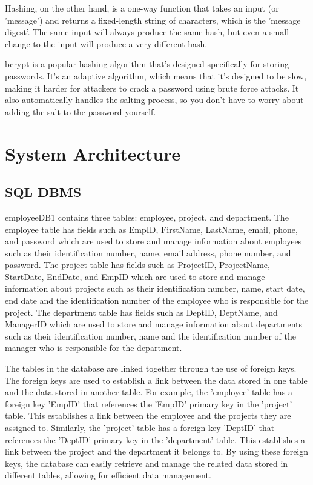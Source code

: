 \documentclass[12pt]{article}
\begin{document}
	Hashing, on the other hand, is a one-way function that takes an input (or 'message') and returns a fixed-length string of characters, which is the 'message digest'. The same input will always produce the same hash, but even a small change to the input will produce a very different hash.
	
	bcrypt is a popular hashing algorithm that's designed specifically for storing passwords. It's an adaptive algorithm, which means that it's designed to be slow, making it harder for attackers to crack a password using brute force attacks. It also automatically handles the salting process, so you don't have to worry about adding the salt to the password yourself.
	
	\section*{System Architecture}
	\subsection*{SQL DBMS}
	employeeDB1 contains three tables: employee, project, and department. The employee table has fields such as EmpID, FirstName, LastName, email, phone, and password which are used to store and manage information about employees such as their identification number, name, email address, phone number, and password. The project table has fields such as ProjectID, ProjectName, StartDate, EndDate, and EmpID which are used to store and manage information about projects such as their identification number, name, start date, end date and the identification number of the employee who is responsible for the project. The department table has fields such as DeptID, DeptName, and ManagerID which are used to store and manage information about departments such as their identification number, name and the identification number of the manager who is responsible for the department.
	
	The tables in the database are linked together through the use of foreign keys. The foreign keys are used to establish a link between the data stored in one table and the data stored in another table. For example, the 'employee' table has a foreign key 'EmpID' that references the 'EmpID' primary key in the 'project' table. This establishes a link between the employee and the projects they are assigned to. Similarly, the 'project' table has a foreign key 'DeptID' that references the 'DeptID' primary key in the 'department' table. This establishes a link between the project and the department it belongs to. By using these foreign keys, the database can easily retrieve and manage the related data stored in different tables, allowing for efficient data management.
	
\end{document}
